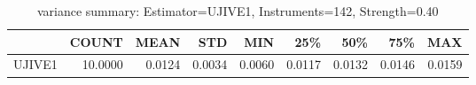\begin{table}[ht]
\centering
\caption{variance summary: Estimator=UJIVE1, Instruments=142, Strength=0.40}
\begin{tabular}{lrrrrrrrr}
\toprule
 & COUNT & MEAN & STD & MIN & 25\% & 50\% & 75\% & MAX \\
\midrule
UJIVE1 & 10.0000 & 0.0124 & 0.0034 & 0.0060 & 0.0117 & 0.0132 & 0.0146 & 0.0159 \\
\bottomrule
\end{tabular}
\end{table}
